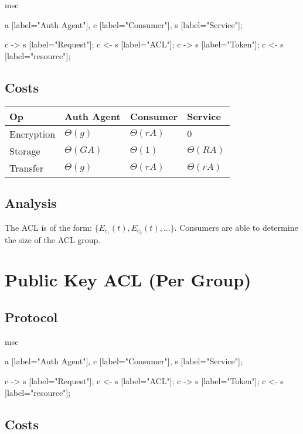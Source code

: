 \documentclass[pdftex,12pt,a4papaer]{article}
\begin{document}
\begin{msc}
msc {
    a [label="Auth Agent"],
    c [label="Consumer"],
    s [label="Service"];

    c -> s [label="Request"];
    c <- s [label="ACL"];
    c -> s [label="Token"];
    c <- s [label="resource"];
}
\end{msc}

\subsection{Costs}

\begin{tabular}{l|l|l|l}
 Op & Auth Agent & Consumer & Service \\ \hline
 Encryption & $\Theta(g)$ & $\Theta(rA)$ & $0$ \\
    Storage & $\Theta(GA)$ & $\Theta(1)$ & $\Theta(RA)$ \\
    Transfer & $\Theta(g)$ & $\Theta(rA)$ & $\Theta(rA)$
\end{tabular}

\subsection{Analysis}

The ACL is of the form: $\{E_{c_1}(t), E_{c_2}(t), ...\}$. Consumers are able to
determine the size of the ACL group.

\pagebreak

\section{Public Key ACL (Per Group)}  %

\subsection{Protocol}

\begin{msc}
msc {
    a [label="Auth Agent"],
    c [label="Consumer"],
    s [label="Service"];

    c -> s [label="Request"];
    c <- s [label="ACL"];
    c -> s [label="Token"];
    c <- s [label="resource"];
}
\end{msc}

\subsection{Costs}
\end{document}
